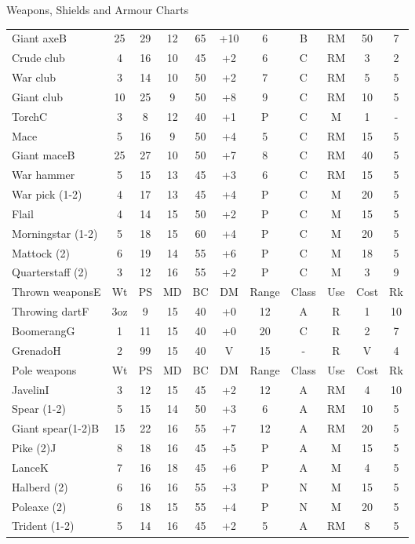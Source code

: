 \begin{Tables}{Weapons, Shields and Armour Charts}
\begin{tabularx}{\linewidth}{Xcccccccccc}
Giant axeB		& 25	& 29	& 12	& 65	& +10	& 6	& B	& RM	& 50	& 7	\\
Crude club		& 4	& 16	& 10	& 45	& +2	& 6	& C	& RM	& 3	& 2	\\
War club		& 3	& 14	& 10	& 50	& +2	& 7	& C	& RM	& 5	& 5	\\
Giant club		& 10	& 25	& 9	& 50	& +8	& 9	& C	& RM	& 10	& 5	\\
TorchC			& 3	& 8	& 12	& 40	& +1	& P	& C	& M	& 1	& -	\\
Mace			& 5	& 16	& 9	& 50	& +4	& 5	& C	& RM	& 15	& 5	\\
Giant maceB		& 25	& 27	& 10	& 50	& +7	& 8	& C	& RM	& 40	& 5	\\
War hammer		& 5	& 15	& 13	& 45	& +3	& 6	& C	& RM	& 15	& 5	\\
War pick (1-2)		& 4	& 17	& 13	& 45	& +4	& P	& C	& M	& 20	& 5	\\
Flail			& 4	& 14	& 15	& 50	& +2	& P	& C	& M	& 15	& 5	\\
Morningstar (1-2)	& 5	& 18	& 15	& 60	& +4	& P	& C	& M	& 20	& 5	\\
Mattock (2)		& 6	& 19	& 14	& 55	& +6	& P	& C	& M	& 18	& 5	\\
Quarterstaff (2)	& 3	& 12	& 16	& 55	& +2	& P	& C	& M	& 3	& 9	\\ 
Thrown weaponsE		& Wt	& PS	& MD	& BC	& DM	& Range	& Class	& Use	& Cost	& Rk	\\
Throwing dartF		& 3oz	& 9	& 15	& 40	& +0	& 12	& A	& R	& 1	& 10	\\
BoomerangG		& 1	& 11	& 15	& 40	& +0	& 20	& C	& R	& 2	& 7	\\
GrenadoH		& 2	& 99	& 15	& 40	& V	& 15	& -	& R	& V	& 4	\\
Pole weapons		& Wt	& PS	& MD	& BC	& DM	& Range	& Class	& Use	& Cost	& Rk	\\
JavelinI		& 3	& 12	& 15	& 45	& +2	& 12	& A	& RM	& 4	& 10	\\
Spear (1-2)		& 5	& 15	& 14	& 50	& +3	& 6	& A	& RM	& 10	& 5	\\
Giant spear(1-2)B	& 15	& 22	& 16	& 55	& +7	& 12	& A	& RM	& 20	& 5	\\
Pike (2)J		& 8	& 18	& 16	& 45	& +5	& P	& A	& M	& 15	& 5	\\
LanceK			& 7	& 16	& 18	& 45	& +6	& P	& A	& M	& 4	& 5	\\
Halberd (2)		& 6	& 16	& 16	& 55	& +3	& P	& N	& M	& 15	& 5	\\
Poleaxe (2)		& 6	& 18	& 15	& 55	& +4	& P	& N	& M	& 20	& 5	\\
Trident (1-2)		& 5	& 14	& 16	& 45	& +2	& 5	& A	& RM	& 8	& 5	\\

\end{tabularx}
\end{Tables}

